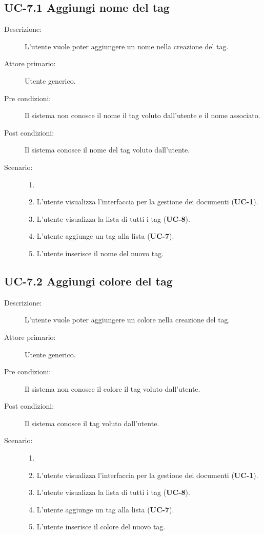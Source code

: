 \subsection{UC-7.1 Aggiungi nome del tag}
\begin{description}
    \item[Descrizione:] L’utente vuole poter aggiungere un nome nella creazione del tag.
    \item[Attore primario:] Utente generico.
    \item[Pre condizioni:] Il sistema non conosce il nome  il tag voluto dall’utente e il nome associato.
    \item[Post condizioni:] Il sistema conosce il nome del tag voluto dall’utente.
    \item[Scenario:]
    \begin{enumerate}
        \item[] 
        \item L’utente visualizza l'interfaccia per la gestione dei documenti (\textbf{UC-1}).
        \item L’utente visualizza la lista di tutti i tag (\textbf{UC-8}).
        \item L'utente aggiunge un tag alla lista (\textbf{UC-7}).
        \item L'utente inserisce il nome del nuovo tag.
    \end{enumerate}
\end{description}

\subsection{UC-7.2 Aggiungi colore del tag}
\begin{description}
    \item[Descrizione:] L’utente vuole poter aggiungere un colore nella creazione del tag.
    \item[Attore primario:] Utente generico.
    \item[Pre condizioni:] Il sistema non conosce il colore il tag voluto dall’utente.
    \item[Post condizioni:] Il sistema conosce il tag voluto dall’utente.
    \item[Scenario:]
    \begin{enumerate}
        \item[] 
        \item L’utente visualizza l'interfaccia per la gestione dei documenti (\textbf{UC-1}).
        \item L’utente visualizza la lista di tutti i tag (\textbf{UC-8}).
        \item L'utente aggiunge un tag alla lista (\textbf{UC-7}).
        \item L'utente inserisce il colore del nuovo tag.
    \end{enumerate}
\end{description}

